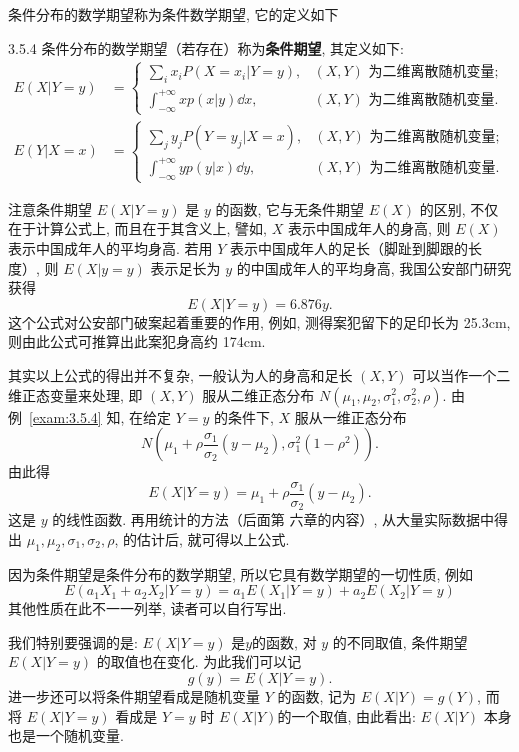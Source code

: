 	条件分布的数学期望称为条件数学期望,  它的定义如下
	\begin{definition}{}{3.5.4}
		条件分布的数学期望（若存在）称为\textbf{条件期望}, 其定义如下:
		\begin{align}
		E(X | Y=y)&=\begin{cases} \sum_{i} x_{i} P\left(X=x_{i} | Y=y\right), &(X,Y)\text{ 为二维离散随机变量};\\
			\int_{-\infty}^{+\infty} x p(x | y) \dd x,	& (X,Y) \text{ 为二维离散随机变量}.
			 \end{cases}\label{eq:3.5.15} \\
			E(Y | X=x)&=\begin{cases} \sum_{j} y_{j} P\left(Y=y_{j} | X=x\right), &(X,Y)\text{ 为二维离散随机变量};\\
			 \int_{-\infty}^{+\infty} y p(y | x) \dd y, &(X,Y)\text{ 为二维离散随机变量}. 
			\end{cases}\label{eq:3.5.16}
		\end{align}
	\end{definition}
	注意条件期望 $E(X|Y=y)$ 是 $y$ 的函数, 它与无条件期望 $E(X)$ 的区别, 不仅在于计算公式上, 而且在于其含义上, 
	譬如, $X$ 表示中国成年人的身高, 则 $E(X)$ 表示中国成年人的平均身高. 
	若用 $Y$ 表示中国成年人的足长（脚趾到脚跟的长度）, 则 $E(X|y=y)$ 表示足长为 $y$ 的中国成年人的平均身高, 
	我国公安部门研究获得
	\[
		E(X | Y=y)=6.876 y.
	\]
	这个公式对公安部门破案起着重要的作用, 例如, 测得案犯留下的足印长为 25.3cm, 
	则由此公式可推算出此案犯身高约 174cm.
	
	其实以上公式的得出并不复杂, 
	一般认为人的身高和足长 $(X,Y)$ 可以当作一个二维正态变量来处理, 
	即 $(X,Y)$ 服从二维正态分布 $N(\mu_1,\mu_2,\sigma_1^2,\sigma_2^2,\rho)$. 由例~\ref{exam:3.5.4} 
	知, 在给定 $Y=y$ 的条件下, $X$ 服从一维正态分布
	\[
		N\left(\mu_{1}+\rho \frac{\sigma_{1}}{\sigma_{2}}\left(y-\mu_{2}\right),
		 \sigma_{1}^{2}\left(1-\rho^{2}\right)\right).
	\]
	由此得
	\[
		E(X | Y=y)=\mu_{1}+\rho \frac{\sigma_{1}}{\sigma_{2}}\left(y-\mu_{2}\right).	
	\]
	这是 $y$ 的线性函数. 再用统计的方法（后面第
	六章的内容）, 从大量实际数据中得出 $\mu_1,\mu_2,\sigma_1,\sigma_2,\rho$, 的估计后, 就可得以上公式.

	因为条件期望是条件分布的数学期望, 所以它具有数学期望的一切性质, 例如
	\[
		E\left(a_{1} X_{1}+a_{2} X_{2} | Y=y\right)=a_{1} E\left(X_{1} | Y=y\right)+a_{2} E\left(X_{2} | Y=y\right)
	\]
	其他性质在此不一一列举, 读者可以自行写出.

	我们特别要强调的是: $E(X|Y=y)$ 是$y$的函数, 对 $y$ 的不同取值, 条件期望 $E(X|Y=y)$ 的取值也在变化.
	为此我们可以记
	\[
		g(y)=E(X | Y=y).
	\]
	进一步还可以将条件期望看成是随机变量 $Y$ 的函数, 记为 $E(X|Y)=g(Y)$, 而将 $E(X|Y=y)$ 
	看成是 $Y=y$ 时 $E(X|Y)$的一个取值, 由此看出: $E(X|Y)$ 本身也是一个随机变量.

